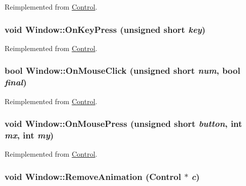 Reimplemented from \hyperlink{class_control_40b01c0e65c2fec12afb950d3758983f}{Control}.\hypertarget{class_window_f6f46c0dd9ed75cc8639ca61f8773862}{
\subsubsection[{OnKeyPress}]{\setlength{\rightskip}{0pt plus 5cm}void Window::OnKeyPress (unsigned short {\em key})}}
\label{class_window_f6f46c0dd9ed75cc8639ca61f8773862}




Reimplemented from \hyperlink{class_control_381e61b70477155845f58a2d17b91c6a}{Control}.\hypertarget{class_window_0372a8a9db26dd21a60d4bd71a2547b5}{
\subsubsection[{OnMouseClick}]{\setlength{\rightskip}{0pt plus 5cm}bool Window::OnMouseClick (unsigned short {\em num}, \/  bool {\em final})}}
\label{class_window_0372a8a9db26dd21a60d4bd71a2547b5}




Reimplemented from \hyperlink{class_control_1a32f38d1f66f764e6e3a5d8de42d0e0}{Control}.\hypertarget{class_window_dcf06ec1829e73c79c0c3e4703463a03}{
\subsubsection[{OnMousePress}]{\setlength{\rightskip}{0pt plus 5cm}void Window::OnMousePress (unsigned short {\em button}, \/  int {\em mx}, \/  int {\em my})}}
\label{class_window_dcf06ec1829e73c79c0c3e4703463a03}




Reimplemented from \hyperlink{class_control_17ebdd745fcaf245f8d8ab38fa534072}{Control}.\hypertarget{class_window_4bcf4b16db04e876b0f58c184708d280}{
\subsubsection[{RemoveAnimation}]{\setlength{\rightskip}{0pt plus 5cm}void Window::RemoveAnimation ({\bf Control} $\ast$ {\em c})}}
\label{class_window_4bcf4b16db04e876b0f58c184708d280}



